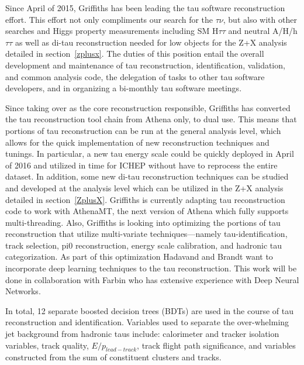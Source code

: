 \label{tau-reco}
Since April of 2015, Griffiths has been leading the tau software reconstruction effort.  This effort not only compliments our search for the \Hp \too $\tau \nu$, but also with other searches and Higgs property measurements 
including SM H\too $\tau\tau$ and neutral A/H/h \too $\tau\tau$ as well as di-tau reconstruction needed for low \pt objects for the Z+X analysis detailed in section~\ref{zplusx}.  
The duties of this position entail the overall development and maintenance of tau reconstruction, identification, validation, and common analysis code, the delegation 
of tasks to other tau software developers, and in organizing a bi-monthly tau software meetings.

Since taking over as the core reconstruction responsible, Griffiths has converted the tau reconstruction tool chain from Athena only, to dual use.  
This means that portions of tau reconstruction can be run at the general analysis level, which allows for the quick implementation of new reconstruction techniques and tunings.  
In particular, a new tau energy scale could be quickly deployed in April of 2016 and utilized in time for ICHEP without have to reprocess the entire dataset.  
In addition, some new di-tau reconstruction techniques can be studied and developed at the analysis level which can be utilized in the Z+X analysis detailed in section~\ref{ZplusX}.
Griffiths is currently adapting tau reconstruction code to work with AthenaMT, the next version of Athena which fully supports multi-threading. 
Also, Griffiths is looking into optimizing the portions of tau reconstruction that utilize multi-variate techniques—namely tau-identification, track selection, pi0 reconstruction, energy scale calibration, and hadronic tau categorization.
As part of this optimization Hadavand and Brandt want to incorporate deep learning techniques to the tau reconstruction. This work will be done in collaboration with Farbin who has extensive experience with Deep Neural Networks.

In total, 12 separate boosted decision trees (BDTs) are used in the course of tau reconstruction and identification.  Variables used to separate the over-whelming jet background from hadronic taus include: calorimeter and tracker isolation variables, track quality, $E/p_{lead-track}$, track flight path significance, and variables constructed from the sum of constituent clusters and tracks.   
